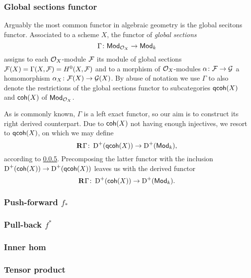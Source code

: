 \subsubsection{Global sections functor}
Arguably the most common functor in algebraic geometry is the global secitons functor. Associated to a scheme $X$, the functor of \emph{global sections}
\[
    \Gamma \colon \mathsf{Mod}_{\mathcal O_X} \to \mathsf{Mod}_{k}
\]
assigns to each $\mathcal O_X$-module $\mathcal F$ its module of global sections $\mathcal F(X) = \Gamma(X, \mathcal F) = H^0(X, \mathcal F)$ and to a morphism of $\mathcal O_X$-modules $\alpha\colon \mathcal F \to \mathcal G$ a homomorphism $\alpha_X \colon \mathcal F(X) \to \mathcal G(X)$.
By abuse of notation we use $\Gamma$ to also denote the restrictions of the global sections functor to subcategories $\mathsf{qcoh}(X)$ and $\mathsf{coh}(X)$ of $\mathsf{Mod}_{\mathcal O_X}$.

As is commonly known, $\Gamma$ is a left exact functor, so our aim is to construct its right derived counterpart. Due to $\mathsf{coh}(X)$ not having enough injectives, we resort to $\mathsf{qcoh}(X)$, on which we may define 
\[
    \mathbf{R}^{}\Gamma\colon \operatorname{D}^+(\mathsf{qcoh}(X)) \to \operatorname{D}^+(\mathsf{Mod}_{k}),
\]
according to \ref{}. Precomposing the latter functor with the inclusion $\operatorname{D}^+(\mathsf{coh}(X)) \to \operatorname{D}^+(\mathsf{qcoh}(X))$ leaves us with the derived functor
\[
    \mathbf{R}^{}\Gamma \colon \operatorname{D}^+(\mathsf{coh}(X)) \to \operatorname{D}^+(\mathsf{Mod}_{k}).
\]







\subsubsection{Push-forward $f_*$}
\subsubsection{Pull-back $f^*$}
\subsubsection{Inner hom}
\subsubsection{Tensor product }
